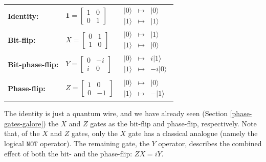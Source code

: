 \documentclass[fleqn,a4paper]{article}
\newenvironment{idea}{\everypar{\setlength{\parindent}{1.5em}}}{}
\theoremstyle{definition}
\theoremstyle{definition}
\theoremstyle{definition}
\theoremstyle{definition}
\theoremstyle{remark}
\begin{document}
\begin{idea}

\centering
\begin{tabular}{lll}
  \textbf{Identity:}
  & $\mathbf{1}= \begin{bmatrix}1&0\\0&1\end{bmatrix}$
  & $\begin{array}{lcr}|0\rangle&\longmapsto&|0\rangle\\|1\rangle&\longmapsto&|1\rangle\end{array}$
\\[2em]
  \textbf{Bit-flip:}
  & $X = \begin{bmatrix}0&1\\1&0\end{bmatrix}$
  & $\begin{array}{lcr}|0\rangle&\longmapsto&|1\rangle\\|1\rangle&\longmapsto&|0\rangle\end{array}$
\\[2em]
  \textbf{Bit-phase-flip:}
  & $Y = \begin{bmatrix}0&-i\\i&0\end{bmatrix}$
  & $\begin{array}{lcr}|0\rangle&\longmapsto&i|1\rangle\\|1\rangle&\longmapsto&-i|0\rangle\end{array}$
\\[2em]
  \textbf{Phase-flip:}
  & $Z = \begin{bmatrix}1&0\\0&-1\end{bmatrix}$
  & $\begin{array}{lcr}|0\rangle&\longmapsto&|0\rangle\\|1\rangle&\longmapsto&-|1\rangle\end{array}$
\end{tabular}

\end{idea}

The identity is just a quantum wire, and we have already seen (Section \ref{phase-gates-galore}) the \(X\) and \(Z\) gates as the bit-flip and phase-flip, respectively.
Note that, of the \(X\) and \(Z\) gates, only the \(X\) gate has a classical analogue (namely the logical \(\texttt{NOT}\) operator).
The remaining gate, the \(Y\) operator, describes the combined effect of both the bit- and the phase-flip: \(ZX=iY\).
\end{document}
